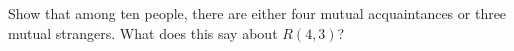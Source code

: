 \documentclass{book}
\begin{document}
\setcounter{project}{49}
\addtocounter{project}{-1}
\begin{activity}[]\label{activity-42}
\hypertarget{p-439}{}%
Show that among ten people, there are either four mutual acquaintances or three mutual strangers.  What does this say about \(R(4,3)\)?%
\end{activity}
\end{document}
